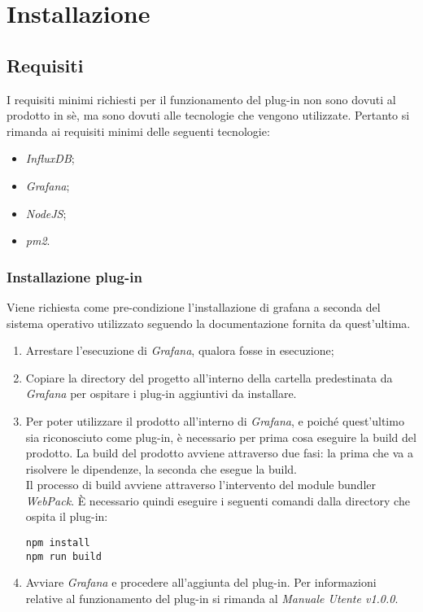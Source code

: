 \section{Installazione}\label{Installazione}

\subsection{Requisiti}\label{Requisiti}
I requisiti minimi richiesti per il funzionamento del plug-in non sono dovuti al prodotto in sè, ma sono dovuti alle tecnologie che vengono utilizzate. Pertanto si rimanda ai requisiti minimi delle seguenti tecnologie:
\begin{itemize}
	\item \textit{InfluxDB};
	\item \textit{Grafana};
	\item \textit{NodeJS}; 
	\item \textit{pm2}. 
\end{itemize}

\subsubsection{Installazione plug-in}
Viene richiesta come pre-condizione l'installazione di grafana a seconda del sistema operativo utilizzato seguendo la documentazione fornita da quest'ultima. 
\begin{enumerate}
	\item Arrestare l'esecuzione di \textit{Grafana}, qualora fosse in esecuzione;	
	\item Copiare la directory del progetto all'interno della cartella predestinata da \textit{Grafana} per ospitare i plug-in aggiuntivi da installare.
	\item Per poter utilizzare il prodotto all'interno di \textit{Grafana}, e poiché quest'ultimo sia riconosciuto come plug-in, è necessario per prima cosa eseguire la build del prodotto.
	La build del prodotto avviene attraverso due fasi: la prima che va a risolvere le dipendenze, la seconda che esegue la build.\\
	Il processo di build avviene attraverso l'intervento del module bundler \textit{WebPack}.
	È necessario quindi eseguire i seguenti comandi dalla directory che ospita il plug-in:
\begin{center}
	\texttt{npm install}\\
	\texttt{npm run build}
\end{center}
\item Avviare \textit{Grafana} e procedere all'aggiunta del plug-in.
Per informazioni relative al funzionamento del plug-in si rimanda al \textit{Manuale Utente v1.0.0}.
\end{enumerate}

